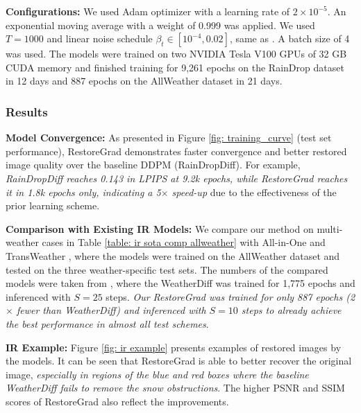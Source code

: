 \noindent\textbf{Configurations:} 
We used Adam optimizer with a learning rate of $2\times 10^{-5}$. An exponential moving average with a weight of 0.999 was applied. We used $T=1000$ and linear noise schedule $\beta_t\in[10^{-4}, 0.02]$, same as \citet{ozdenizci2023restoring}. A batch size of 4 was used. The models were trained on two NVIDIA Tesla V100 GPUs of 32 GB CUDA memory and finished training for 9,261 epochs on the RainDrop dataset in 12 days and 887 epochs on the AllWeather dataset in 21 days.

\subsubsection{Results}

\noindent\textbf{Model Convergence:} As presented in Figure \ref{fig: training_curve} (test set performance), RestoreGrad demonstrates faster convergence and better restored image quality over the baseline DDPM (RainDropDiff). For example, \textit{RainDropDiff reaches 0.143 in LPIPS at 9.2k epochs, while RestoreGrad reaches it in 1.8k epochs only, indicating a 5$\times$ speed-up} due to the effectiveness of the prior learning scheme.

\noindent\textbf{Comparison with Existing IR Models:}
We compare our method on multi-weather cases in Table \ref{table: ir sota comp allweather} with All-in-One \citep{li2020all} and TransWeather \citep{valanarasu2022transweather}, where the models were trained on the AllWeather dataset and tested on the three weather-specific test sets. The numbers of the compared models were taken from \citet{ozdenizci2023restoring}, where the WeatherDiff was trained for 1,775 epochs and inferenced with $S=25$ steps. \textit{Our RestoreGrad was trained for only 887 epochs (2$\times$ fewer than WeatherDiff) and inferenced with $S=10$ steps to already achieve the best performance in almost all test schemes}. 

\noindent\textbf{IR Example:} Figure \ref{fig: ir example} presents examples of restored images by the models. It can be seen that RestoreGrad is able to better recover the original image, \textit{especially in regions of the blue and red boxes where the baseline WeatherDiff fails to remove the snow obstructions}. The higher PSNR and SSIM scores of RestoreGrad also reflect the improvements.

